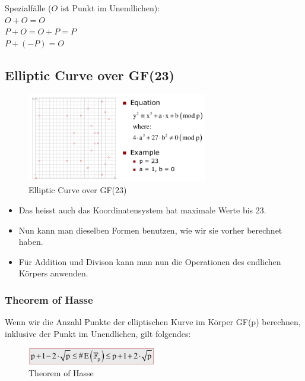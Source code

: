 Spezialfälle ($O$ ist Punkt im Unendlichen):\\
$O + O = O$\\
$P + O = O + P = P$\\
$P + ( - P) = O$

\hypertarget{elliptic-curve-over-gf23}{%
\subsection{Elliptic Curve over GF(23)}\label{elliptic-curve-over-gf23}}

\begin{figure}[H]
\centering
\includegraphics[width=0.7\textwidth]{figures/ellipticCurveGf23.png}
\caption{Elliptic Curve over GF(23)}
\end{figure}

\begin{itemize}
\tightlist
\item
  Das heisst auch das Koordinatensystem hat maximale Werte bis 23.
\item
  Nun kann man dieselben Formen benutzen, wie wir sie vorher berechnet
  haben.
\item
  Für Addition und Divison kann man nun die Operationen des endlichen
  Körpers anwenden.
\end{itemize}

\hypertarget{theorem-of-hasse}{%
\subsubsection{Theorem of Hasse}\label{theorem-of-hasse}}

Wenn wir die Anzahl Punkte der elliptischen Kurve im Körper GF(p) berechnen, inklusive der Punkt im Unendlichen, gilt folgendes:

\begin{figure}[H]
\centering
\includegraphics[width=0.5\textwidth]{figures/theoremHasse.png}
\caption{Theorem of Hasse}
\end{figure}

